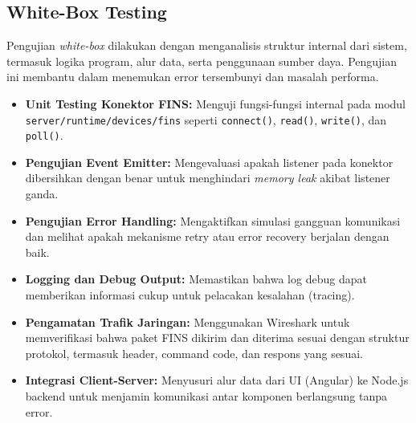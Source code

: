 \subsection{White-Box Testing}

Pengujian \textit{white-box} dilakukan dengan menganalisis struktur internal dari sistem, termasuk logika program, alur data, serta penggunaan sumber daya. Pengujian ini membantu dalam menemukan error tersembunyi dan masalah performa.

\begin{itemize}
    \item \textbf{Unit Testing Konektor FINS:} Menguji fungsi-fungsi internal pada modul \texttt{server/runtime/devices/fins} seperti \texttt{connect()}, \texttt{read()}, \texttt{write()}, dan \texttt{poll()}.
    \item \textbf{Pengujian Event Emitter:} Mengevaluasi apakah listener pada konektor dibersihkan dengan benar untuk menghindari \textit{memory leak} akibat listener ganda.
    \item \textbf{Pengujian Error Handling:} Mengaktifkan simulasi gangguan komunikasi dan melihat apakah mekanisme retry atau error recovery berjalan dengan baik.
    \item \textbf{Logging dan Debug Output:} Memastikan bahwa log debug dapat memberikan informasi cukup untuk pelacakan kesalahan (tracing).
    \item \textbf{Pengamatan Trafik Jaringan:} Menggunakan Wireshark untuk memverifikasi bahwa paket FINS dikirim dan diterima sesuai dengan struktur protokol, termasuk header, command code, dan respons yang sesuai.
    \item \textbf{Integrasi Client-Server:} Menyusuri alur data dari UI (Angular) ke Node.js backend untuk menjamin komunikasi antar komponen berlangsung tanpa error.
\end{itemize}